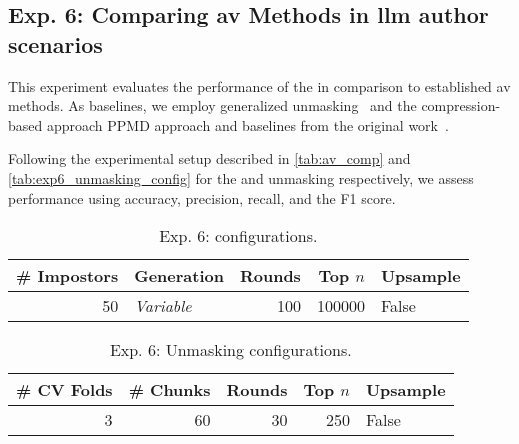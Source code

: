 \subsection{Exp. 6: Comparing \ac{av} Methods in \acs{llm} author scenarios}

This experiment evaluates the performance of the \impAppr{} in comparison to established \ac{av} methods.
As baselines, we employ generalized unmasking~\citep{bevendorff_generalizing_2019} and the compression-based approach PPMD approach and baselines from the original work~\citep{koppel_determining_2014}.

Following the experimental setup described in \autoref{tab:av_comp} and \autoref{tab:exp6_unmasking_config} for the \impAppr{} and unmasking respectively, we assess performance using  accuracy, precision, recall, and the F1 score. 

\begin{table}[h]
\centering\small
\caption{Exp. 6: \impAppr{} configurations.}
\label{tab:av_comp}
\begin{tabular}{@{}rlrrl@{}}   %
\toprule
\# Impostors & Generation & Rounds & Top $n$ & Upsample \\
\midrule
50 & \textit{Variable} & 100 & \num{100000} & False \\
\bottomrule
\end{tabular}%
\end{table}

\begin{table}[h]
\centering\small
\caption{Exp. 6: Unmasking configurations.}
\label{tab:exp6_unmasking_config}
\begin{tabular}{@{}rrrrl@{}}   %
\toprule
\# CV Folds & \# Chunks & Rounds & Top $n$ & Upsample \\
\midrule
3 & 60 & 30 & \num{250} & False \\
\bottomrule
\end{tabular}%
\end{table}
